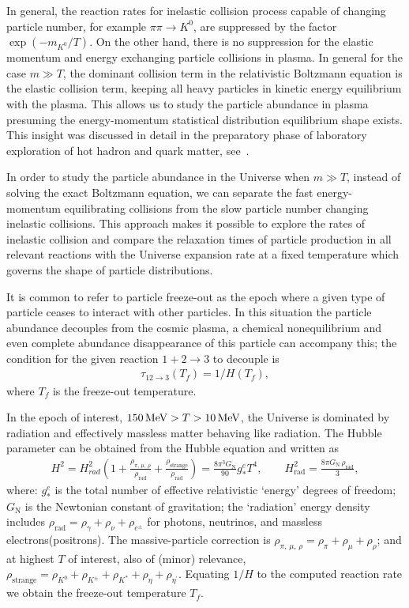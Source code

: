 In general, the reaction rates for inelastic collision process capable of changing particle number, for example $\pi\pi\to K^0$, are suppressed by the factor $\exp{(-m_{K^0}/T)}$. On the other hand, there is no suppression for the elastic momentum and energy exchanging particle collisions in plasma. In general for the case $m\gg T$, the dominant collision term in the relativistic Boltzmann equation is the elastic collision term, keeping all heavy particles in kinetic energy equilibrium with the plasma. This allows us to study the particle abundance in plasma presuming the energy-momentum statistical distribution equilibrium shape exists. This insight was discussed in detail in the preparatory phase of laboratory exploration of hot hadron and quark matter, see~\cite{Koch:1986ud}. 

In order to study the particle abundance in the Universe when $m\gg T$, instead of solving the exact Boltzmann equation, we can separate the fast energy-momentum equilibrating collisions from the slow particle number changing inelastic collisions. This approach makes it possible to explore the rates of inelastic collision and compare the relaxation times of particle production in all relevant reactions with the Universe expansion rate at a fixed temperature which governs the shape of particle distributions.

It is common to refer to particle freeze-out as the epoch where a given type of particle ceases to interact with other particles. In this situation the particle abundance decouples from the cosmic plasma, a chemical nonequilibrium and even complete abundance disappearance of this particle can accompany this; the condition for the given reaction $1+2\rightarrow 3$ to decouple is
\begin{align}
\tau_{12\rightarrow 3}(T_f)=1/H(T_f),
\end{align}
where $T_f$ is the freeze-out temperature.

In the epoch of interest, $150\text{\,MeV}>T>10\text{\,MeV}$, the Universe is dominated by radiation and effectively massless matter behaving like radiation. The Hubble parameter can be obtained from the Hubble equation
 and written as~\cite{Kolb:1990vq}
\begin{align}\label{H2g}
H^2=H^2_{rad}\left(1+\frac{\rho_{\pi,\,\mu,\,\rho}}{\rho_\mathrm{rad}}+\frac{\rho_\mathrm{strange}}{\rho_\mathrm{rad}}\right)=\frac{8\pi^3G_\mathrm{N}}{90}g^e_\ast T^4,\qquad H^2_\mathrm{rad}=\frac{8\pi G_\mathrm{N}\,\rho_\mathrm{rad}}{3},
\end{align}
where: $g^e_\ast$ is the total number of effective relativistic `energy' degrees of freedom; $G_\mathrm{N}$ is the Newtonian constant of gravitation; the `radiation' energy density includes $\rho_\mathrm{rad}=\rho_\gamma+\rho_\nu+\rho_{e^\pm}$ for photons, neutrinos, and massless electrons(positrons). The massive-particle correction is $\rho_{\pi,\,\mu,\,\rho}=\rho_\pi+\rho_\mu+\rho_\rho$; and at highest $T$ of interest, also of (minor) relevance, $\rho_\mathrm{strange}=\rho_{K^0}+\rho_{K^\pm}+\rho_{K^\ast}+\rho_{\eta}+\rho_{\eta^\prime}$.
Equating $1/H$ to the computed reaction rate we obtain the freeze-out temperature $T_f$. 

